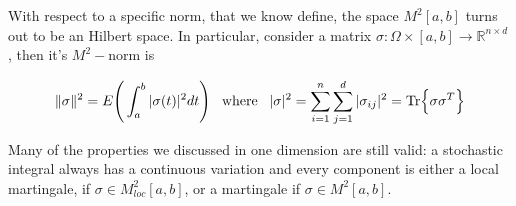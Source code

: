 With respect to a specific norm, that we know define, the space $M^2[a,b]$ turns out to be an Hilbert space. In particular, consider a matrix $\sigma : \Omega \times [a,b] \to \mathbb{R}^{n \times d}$, then it's $M^2-$norm is

\begin{gather*}
    \Vert \sigma \Vert^2 = E\Bigg( \int_a^b \vert \sigma(t) \vert^2 dt \Bigg) \;\;\; \text{where} \;\;\; \vert \sigma \vert^2 = \sum_{i=1}^n \sum_{j=1}^d \vert \sigma_{ij} \vert^2 = \Tr{\sigma \sigma^T}
\end{gather*}

Many of the properties we discussed in one dimension are still valid: a stochastic integral always has a continuous variation and every component is either a local martingale, if $\sigma \in M^2_{loc}[a,b]$, or a martingale if $\sigma \in M^2[a,b]$. 

